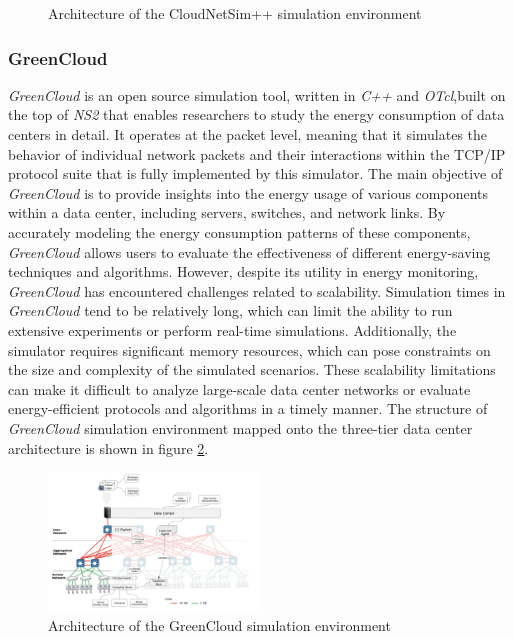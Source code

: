 {\begin{figure}[h]
    \caption{Architecture of the CloudNetSim++ simulation environment}
    \label{fig:cloudnetsim++_arch}
\end{figure}\subsubsection*{GreenCloud}
\emph{GreenCloud} \cite{kliazovich2012greencloud} is an open source simulation tool, written in \emph{C++} and \emph{OTcl},built on the top of \emph{NS2} that enables researchers to study the energy consumption of data centers in detail. It operates at the packet level, meaning that it simulates the behavior of individual network packets and their interactions within the TCP/IP protocol suite that is fully implemented by this simulator. The main objective of \emph{GreenCloud} is to provide insights into the energy usage of various components within a data center, including servers, switches, and network links. By accurately modeling the energy consumption patterns of these components, \emph{GreenCloud} allows users to evaluate the effectiveness of different energy-saving techniques and algorithms. However, despite its utility in energy monitoring, \emph{GreenCloud} has encountered challenges related to scalability. Simulation times in \emph{GreenCloud} tend to be relatively long, which can limit the ability to run extensive experiments or perform real-time simulations. Additionally, the simulator requires significant memory resources, which can pose constraints on the size and complexity of the simulated scenarios. These scalability limitations can make it difficult to analyze large-scale data center networks or evaluate energy-efficient protocols and algorithms in a timely manner. \cite{mansouri2020cloud}
The structure of \emph{GreenCloud} simulation environment mapped onto the three-tier data center architecture is shown in figure \ref{fig:greencloud_arch}. 
\begin{figure}[h]
    \centering
    \includegraphics[width=0.5\textwidth]{chapters/images/greencloud_arch.png}
    \caption{Architecture of the GreenCloud simulation environment}
    \label{fig:greencloud_arch}
\end{figure}
}

